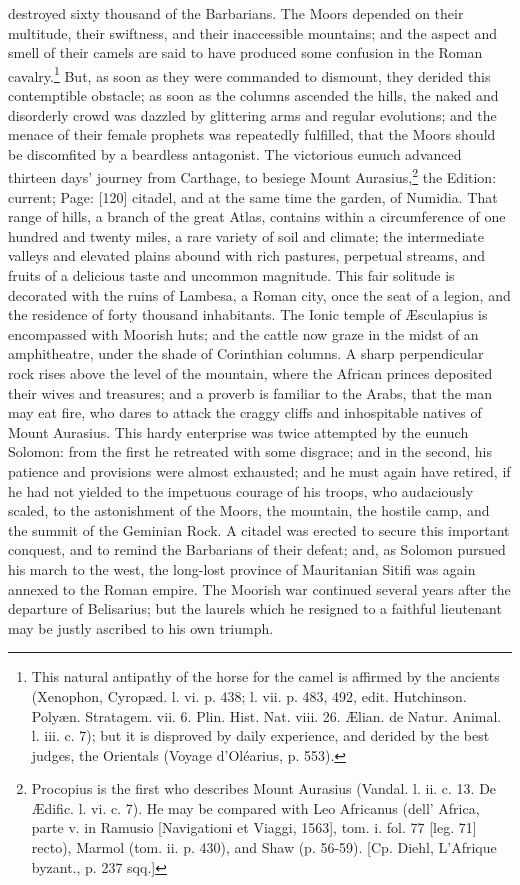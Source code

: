 destroyed sixty thousand of the Barbarians. The Moors depended on their multitude, their swiftness, and their inaccessible mountains; and the aspect and smell of their camels are said to have produced some confusion in the Roman cavalry.\footnote{This natural antipathy of the horse for the camel is affirmed by the ancients (Xenophon, Cyropæd. l. vi. p. 438; l. vii. p. 483, 492, edit. Hutchinson. Polyæn. Stratagem. vii. 6. Plin. Hist. Nat. viii. 26. Ælian. de Natur. Animal. l. iii. c. 7); but it is disproved by daily experience, and derided by the best judges, the Orientals (Voyage d\texthebrew{}’Oléarius, p. 553).} But, as soon as they were commanded to dismount, they derided this contemptible obstacle; as soon as the columns ascended the hills, the naked and disorderly crowd was dazzled by glittering arms and regular evolutions; and the menace of their female prophets was repeatedly fulfilled, that the Moors should be discomfited by a beardless antagonist. The victorious eunuch advanced thirteen days\texthebrew{}’ journey from Carthage, to besiege Mount Aurasius,\footnote{Procopius is the first who describes Mount Aurasius (Vandal. l. ii. c. 13. De Ædific. l. vi. c. 7). He may be compared with Leo Africanus (dell\texthebrew{}’ Africa, parte v. in Ramusio [Navigationi et Viaggi, 1563], tom. i. fol. 77 [leg. 71] recto), Marmol (tom. ii. p. 430), and Shaw (p. 56-59). [Cp. Diehl, L\texthebrew{}’Afrique byzant., p. 237 sqq.]} the Edition: current; Page: [120] citadel, and at the same time the garden, of Numidia. That range of hills, a branch of the great Atlas, contains within a circumference of one hundred and twenty miles, a rare variety of soil and climate; the intermediate valleys and elevated plains abound with rich pastures, perpetual streams, and fruits of a delicious taste and uncommon magnitude. This fair solitude is decorated with the ruins of Lambesa, a Roman city, once the seat of a legion, and the residence of forty thousand inhabitants. The Ionic temple of Æsculapius is encompassed with Moorish huts; and the cattle now graze in the midst of an amphitheatre, under the shade of Corinthian columns. A sharp perpendicular rock rises above the level of the mountain, where the African princes deposited their wives and treasures; and a proverb is familiar to the Arabs, that the man may eat fire, who dares to attack the craggy cliffs and inhospitable natives of Mount Aurasius. This hardy enterprise was twice attempted by the eunuch Solomon: from the first he retreated with some disgrace; and in the second, his patience and provisions were almost exhausted; and he must again have retired, if he had not yielded to the impetuous courage of his troops, who audaciously scaled, to the astonishment of the Moors, the mountain, the hostile camp, and the summit of the Geminian Rock. A citadel was erected to secure this important conquest, and to remind the Barbarians of their defeat; and, as Solomon pursued his march to the west, the long-lost province of Mauritanian Sitifi was again annexed to the Roman empire. The Moorish war continued several years after the departure of Belisarius; but the laurels which he resigned to a faithful lieutenant may be justly ascribed to his own triumph.

